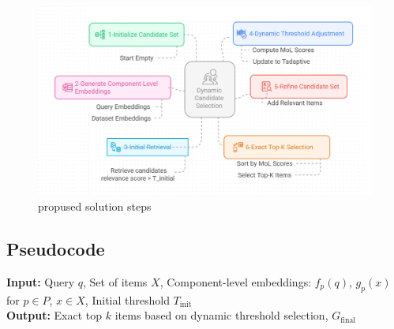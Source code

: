\begin{figure}[ht]
	\centering
	\includegraphics[width=0.7\linewidth]{Figures/propused _solution_steps.png}
	\caption{propused solution steps}
	\label{propused _solution_steps}	
\end{figure}

\subsection{Pseudocode}

\textbf{Input:} Query $q$, Set of items $X$, Component-level embeddings: $f_p(q)$, $g_p(x)$ for $p \in P$, $x \in X$, Initial threshold $T_{\text{init}}$ \\
\textbf{Output:} Exact top $k$ items based on dynamic threshold selection, $G_{\text{final}}$ \\

